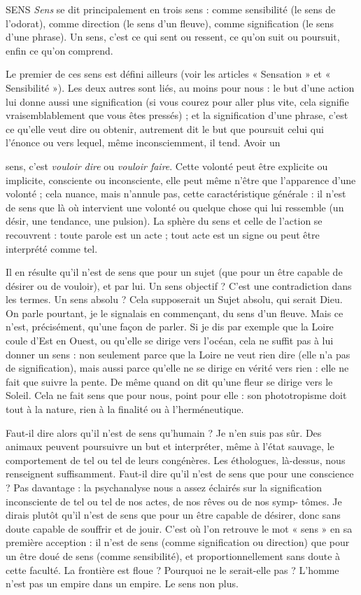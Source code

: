 SENS {\it Sens} se dit principalement en trois sens : comme sensibilité (le sens de
l’odorat), comme direction (le sens d’un fleuve), comme signification
(le sens d’une phrase). Un sens, c’est ce qui sent ou ressent, ce qu’on suit ou
poursuit, enfin ce qu’on comprend.

Le premier de ces sens est défini ailleurs (voir les articles « Sensation » et
« Sensibilité »). Les deux autres sont liés, au moins pour nous : le but d’une
action lui donne aussi une signification (si vous courez pour aller plus vite, cela
signifie vraisemblablement que vous êtes pressés) ; et la signification d’une
phrase, c’est ce qu’elle veut dire ou obtenir, autrement dit le but que poursuit
celui qui l’énonce ou vers lequel, même inconsciemment, il tend. Avoir un

sens, c'est {\it vouloir dire} ou {\it vouloir faire}. Cette volonté peut être explicite ou
implicite, consciente ou inconsciente, elle peut même n’être que l’apparence
d’une volonté ; cela nuance, mais n’annule pas, cette caractéristique générale :
il n’est de sens que là où intervient une volonté ou quelque chose qui lui ressemble
(un désir, une tendance, une pulsion). La sphère du sens et celle de
l’action se recouvrent : toute parole est un acte ; tout acte est un signe ou peut
être interprété comme tel.

Il en résulte qu’il n’est de sens que pour un sujet (que pour un être capable
de désirer ou de vouloir), et par lui. Un sens objectif ? C’est une contradiction
dans les termes. Un sens absolu ? Cela supposerait un Sujet absolu, qui serait
Dieu. On parle pourtant, je le signalais en commençant, du sens d’un fleuve.
Mais ce n’est, précisément, qu’une façon de parler. Si je dis par exemple que la
Loire coule d’Est en Ouest, ou qu’elle se dirige vers l’océan, cela ne suffit pas à
lui donner un sens : non seulement parce que la Loire ne veut rien dire (elle n’a
pas de signification), mais aussi parce qu’elle ne se dirige en vérité vers rien :
elle ne fait que suivre la pente. De même quand on dit qu’une fleur se dirige
vers le Soleil. Cela ne fait sens que pour nous, point pour elle : son phototropisme
doit tout à la nature, rien à la finalité ou à l’herméneutique.

Faut-il dire alors qu’il n’est de sens qu’humain ? Je n’en suis pas sûr. Des
animaux peuvent poursuivre un but et interpréter, même à l’état sauvage, le
comportement de tel ou tel de leurs congénères. Les éthologues, là-dessus, nous
renseignent suffisamment. Faut-il dire qu’il n’est de sens que pour une
conscience ? Pas davantage : la psychanalyse nous a assez éclairés sur la signification
inconsciente de tel ou tel de nos actes, de nos rêves ou de nos symp-
tômes. Je dirais plutôt qu’il n’est de sens que pour un être capable de désirer,
donc sans doute capable de souffrir et de jouir. C’est où l’on retrouve le mot
« sens » en sa première acception : il n’est de sens (comme signification ou
direction) que pour un être doué de sens (comme sensibilité), et proportionnellement
sans doute à cette faculté. La frontière est floue ? Pourquoi ne le serait-elle
pas ? L'homme n’est pas un empire dans un empire. Le sens non plus.

